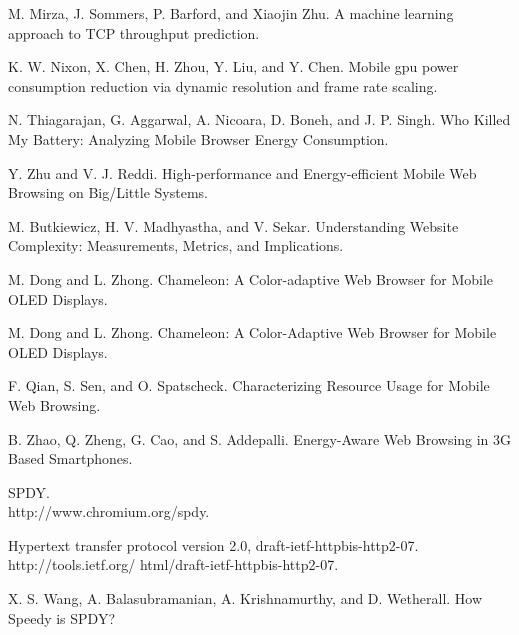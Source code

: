 \documentclass{sig-alternate-05-2015}
\begin{document}
\begin{thebibliography}{1}
	\newblock M. Mirza, J. Sommers, P. Barford, and Xiaojin Zhu. A machine learning approach to TCP throughput prediction.
	\newblock {}
	
	\newblock K. W. Nixon, X. Chen, H. Zhou, Y. Liu, and Y. Chen. Mobile gpu power consumption reduction via dynamic resolution and frame rate scaling.
	\newblock {}
	
	\newblock N. Thiagarajan, G. Aggarwal, A. Nicoara, D. Boneh, and J. P. Singh. Who Killed My Battery: Analyzing Mobile Browser Energy Consumption.
	\newblock {}
	
	\newblock Y. Zhu and V. J. Reddi. High-performance and Energy-efficient Mobile Web Browsing on Big/Little Systems.
	\newblock {}
	
	\newblock M. Butkiewicz, H. V. Madhyastha, and V. Sekar. Understanding Website Complexity: Measurements, Metrics, and Implications.
	\newblock {}
	
	\newblock M. Dong and L. Zhong. Chameleon: A Color-adaptive Web Browser for Mobile OLED Displays.
	\newblock {}
	
	\newblock M. Dong and L. Zhong. Chameleon: A Color-Adaptive Web Browser for Mobile OLED Displays.
	\newblock {}
	
	\newblock F. Qian, S. Sen, and O. Spatscheck. Characterizing Resource Usage for Mobile Web Browsing.
	\newblock {}
	
	\newblock B. Zhao, Q. Zheng, G. Cao, and S. Addepalli. Energy-Aware Web Browsing in 3G Based Smartphones.
	\newblock {}
	
	\newblock SPDY. \\
	\newblock http://www.chromium.org/spdy.
	
	\newblock Hypertext transfer protocol version 2.0, draft-ietf-httpbis-http2-07.
	\newblock http://tools.ietf.org/ html/draft-ietf-httpbis-http2-07.
	
	\newblock X. S. Wang, A. Balasubramanian, A. Krishnamurthy, and D. Wetherall. How Speedy is SPDY?
	\newblock {}
	

\end{thebibliography}
\end{document}
